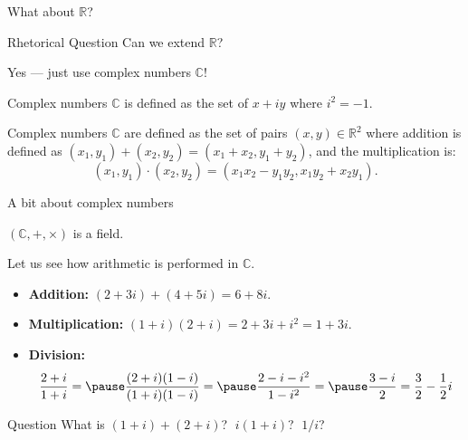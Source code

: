 \documentclass{zkdl-presentation-template}
\begin{document}
    \begin{frame}{What about $\mathbb{R}$?}
        \begin{questionblock}{Rhetorical Question}
           Can we extend $\mathbb{R}$?\pause
        \end{questionblock}

        Yes --- just use complex numbers $\mathbb{C}$!\pause

        \begin{definition}
            Complex numbers $\mathbb{C}$ is defined as the set of $x+iy$ where $i^2=-1$.\pause
        \end{definition}

        \begin{definition}
            Complex numbers $\mathbb{C}$ are defined as the set of pairs $(x,y) \in \mathbb{R}^2$ where addition is defined as $(x_1,y_1)+(x_2,y_2)=(x_1+x_2,y_1+y_2)$, and the multiplication is:
            \begin{equation*}
                (x_1,y_1) \cdot (x_2,y_2) = (x_1x_2-y_1y_2,x_1y_2+x_2y_1).
            \end{equation*}
        \end{definition}
    \end{frame}

    \begin{frame}{A bit about complex numbers}
        \begin{theorem}
            $(\mathbb{C},+,\times)$ is a field.\pause
        \end{theorem}

        \begin{example}
            Let us see how arithmetic is performed in $\mathbb{C}$.
            \begin{itemize}
                \item \textbf{Addition:} $(2+3i)+(4+5i)=6+8i$.\pause
                \item \textbf{Multiplication:} $(1+i)(2+i)=2+3i+i^2=1+3i$.\pause
                \item \textbf{Division:}
                \begin{equation*}
                    \frac{2+i}{1+i} =\pause \frac{(2+i)(1-i)}{(1+i)(1-i)} =\pause \frac{2-i-i^2}{1-i^2} =\pause \frac{3-i}{2} = \frac{3}{2} - \frac{1}{2}i
                \end{equation*}
            \end{itemize}
        \end{example}
        \pause

        \begin{questionblock}{Question}
            What is $(1+i)+(2+i)$? \pause $\;i(1+i)$? \pause $\;1/i$?
        \end{questionblock}
    \end{frame}
\end{document}
